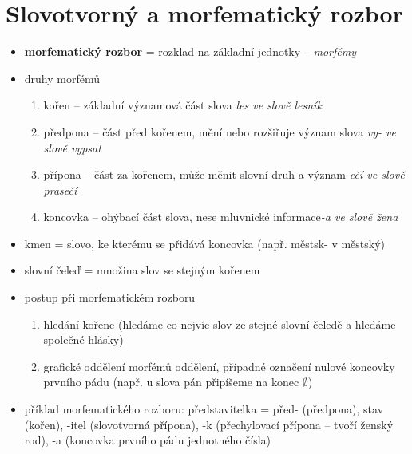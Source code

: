 \documentclass{memoir}
\begin{document}
\section*{Slovotvorný a morfematický rozbor}
\begin{itemize}
	\item \textbf{morfematický rozbor} = rozklad na základní jednotky -- \textit{morfémy}
	\item druhy morfémů
	\begin{enumerate}
		\item kořen -- základní významová část slova \hfill\textit{les ve slově lesník}
		\item předpona -- část před kořenem, mění nebo rozšiřuje význam slova \hfill\textit{vy- ve slově vypsat}
		\item přípona -- část za kořenem, může měnit slovní druh a význam\hfill\textit{-ečí ve slově prasečí}
		\item koncovka -- ohýbací část slova, nese mluvnické informace\hfill\textit{-a ve slově žena}
	\end{enumerate}

	\item kmen = slovo, ke kterému se přidává koncovka (např. městsk- v městský)
	\item slovní čeleď = množina slov se stejným kořenem
	\item postup při morfematickém rozboru
	\begin{enumerate}
		\item hledání kořene (hledáme co nejvíc slov ze stejné slovní čeledě a hledáme společné hlásky)
		\item grafické oddělení morfémů oddělení, případné označení nulové koncovky prvního pádu (např. u slova pán připíšeme na konec $\emptyset$)
	\end{enumerate}
	\item příklad morfematického rozboru: představitelka = před- (předpona), stav (kořen), -itel (slovotvorná přípona), -k (přechylovací přípona -- tvoří ženský rod), -a (koncovka prvního pádu jednotného čísla)
\end{itemize}
\end{document}
